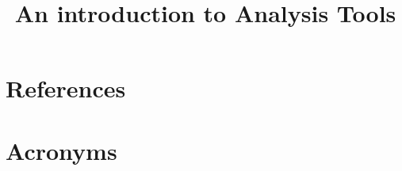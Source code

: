 \documentclass[DM,lsstdraft,authoryear,toc]{lsstdoc}
\title{An introduction to Analysis Tools}
\date{\vcsDate}
\begin{document}
\maketitle


\appendix
\section{References} \label{sec:bib}
\renewcommand{\refname}{} %


\section{Acronyms} \label{sec:acronyms}

\end{document}
